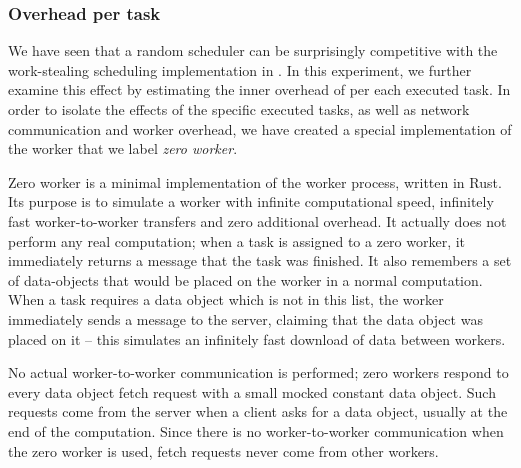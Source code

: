 

\subsubsection*{Overhead per task}
\label{sec:dask-overhead-per-task}
We have seen that a random scheduler can be surprisingly competitive with the work-stealing
scheduling implementation in \dask{}. In this experiment, we further examine
this effect by estimating the inner overhead of \dask{} per each executed task.
In order to isolate the effects of the specific executed tasks, as well as network communication
and worker overhead, we have created a special implementation of the \dask{}
worker that we label \emph{zero worker}.

Zero worker is a minimal implementation of the \dask{} worker process, written
in Rust. Its purpose is to simulate a worker with infinite computational speed, infinitely fast
worker-to-worker transfers and zero additional overhead. It actually does not perform any real
computation; when a task is assigned to a zero worker, it immediately returns a message that the
task was finished. It also remembers a set of data-objects that would be placed on the worker in a
normal computation. When a task requires a data object which is not in this list, the worker
immediately sends a message to the server, claiming that the data object was placed on it -- this
simulates an infinitely fast download of data between workers.

No actual worker-to-worker communication is performed; zero workers respond to every data object
fetch request with a small mocked constant data object. Such requests come from the server when a
client asks for a data object, usually at the end of the computation. Since there is no
worker-to-worker communication when the zero worker is used, fetch requests never come from other
workers.

